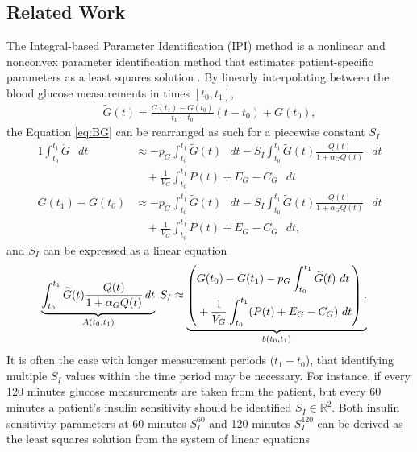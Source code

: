 \documentclass[nomenclature, english, bibtex]{kththesis}
\newcommand{\diff}{\mathop{}\!d}
\begin{document}
\subsection{Related Work} \label{sec:integral}
The Integral-based Parameter Identification (\gls{IPI}) method is a nonlinear and nonconvex parameter identification method that estimates patient-specific parameters as a least squares solution \cite{hann_integral-based_2005}. By linearly interpolating between the blood glucose measurements in times $[t_0,t_1]$,
\begin{align}
    \widetilde{G}(t) = \frac{G(t_1) - G(t_0)}{t_1 - t_0}(t-t_0) + G(t_0),
\end{align}
the Equation \eqref{eq:BG} can be rearranged as such for a piecewise constant $S_I$ 
\begin{alignat}{1}
    \int_{t_0}^{t_1} \dot{G} \, \diff t &\approx 
        -p_G \int_{t_0}^{t_1} \widetilde{G}(t) \, \diff t - S_I \int_{t_0}^{t_1} \widetilde{G}(t) \frac{Q(t)}{1+\alpha_G Q(t)} \, \diff t \nonumber \\ & \quad + \frac{1}{V_G} \int_{t_0}^{t_1} P(t) + E_G - C_G \, \diff t  \\
    G(t_1) - G(t_0) &\approx 
            -p_G \int_{t_0}^{t_1} \widetilde{G}(t) \, \diff t - S_I \int_{t_0}^{t_1} \widetilde{G}(t) \frac{Q(t)}{1+\alpha_G Q(t)} \, \diff t \nonumber \\ & \quad + \frac{1}{V_G} \int_{t_0}^{t_1} P(t) + E_G - C_G \, \diff t,
\end{alignat}
and $S_I$ can be expressed as a linear equation
\begin{equation} \label{eq:integral_based}
    \begin{aligned}
        \underbrace{\int_{t_0}^{t_1} \widetilde{G}(t) \frac{Q(t)}{1+\alpha_G Q(t)} \diff t}_{A(t_0, t_1)} \hspace{0.25em} S_I
        &\approx \underbrace{\left(
            \begin{aligned}
            &G(t_0) - G(t_1)
            - p_G \int_{t_0}^{t_1} \widetilde{G}(t)\, \diff t \\
            &+ \frac{1}{V_G} \int_{t_0}^{t_1} (P(t) + E_G - C_G)\, \diff t
            \end{aligned}
          \right).}_{b(t_0, t_1)}
    \end{aligned}
\end{equation}
It is often the case with longer measurement periods ($t_1 - t_0$), that identifying multiple $S_I$ values within the time period may be necessary. For instance, if every 120 minutes glucose measurements are taken from the patient, but every 60 minutes a patient's insulin sensitivity should be identified $S_I \in \mathbb{R}^2$. Both insulin sensitivity parameters at 60 minutes $S_I^{60}$ and 120 minutes $S_I^{120}$ can be derived as the least squares solution from the system of linear equations
\end{document}

